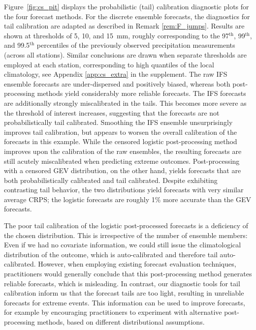 \documentclass[12pt]{article}
\newcommand{\1}{\mathbf{1}} %
\theoremstyle{definition}
\begin{document}
Figure~\ref{fig:cs_pit} displays the probabilistic (tail) calibration diagnostic plots for the four forecast methods. For the discrete ensemble forecasts, the diagnostics for tail calibration are adapted as described in Remark \ref{rem:F_jumps}. Results are shown at thresholds of 5, 10, and \qty{15}{mm}, roughly corresponding to the 97$^{\text{th}}$, 99$^{\text{th}}$, and 99.5$^{\text{th}}$ percentiles of the previously observed precipitation measurements (across all stations). Similar conclusions are drawn when separate thresholds are employed at each station, corresponding to high quantiles of the local climatology, see Appendix \ref{app:cs_extra} in the supplement. The raw IFS ensemble forecasts are under-dispersed and positively biased, whereas both post-processing methods yield considerably more reliable forecasts. The IFS forecasts are additionally strongly miscalibrated in the tails. This becomes more severe as the threshold of interest increases, suggesting that the forecasts are not probabilistically tail calibrated. Smoothing the IFS ensemble unsurprisingly improves tail calibration, but appears to worsen the overall calibration of the forecasts in this example. While the censored logistic post-processing method improves upon the calibration of the raw ensembles, the resulting forecasts are still acutely miscalibrated when predicting extreme outcomes. Post-processing with a censored GEV distribution, on the other hand, yields forecasts that are both probabilistically calibrated and tail calibrated. Despite exhibiting contrasting tail behavior, the two distributions yield forecasts with very similar average CRPS; the logistic forecasts are roughly 1\% more accurate than the GEV forecasts.

The poor tail calibration of the logistic post-processed forecasts is a deficiency of the chosen distribution. This is irrespective of the number of ensemble members: Even if we had no covariate information, we could still issue the climatological distribution of the outcome, which is auto-calibrated and therefore tail auto-calibrated. However, when employing existing forecast evaluation techniques, practitioners would generally conclude that this post-processing method generates reliable forecasts, which is misleading. In contrast, our diagnostic tools for tail calibration inform us that the forecast tails are too light, resulting in unreliable forecasts for extreme events. This information can be used to improve forecasts, for example by encouraging practitioners to experiment with alternative post-processing methods, based on different distributional assumptions.
\end{document}
